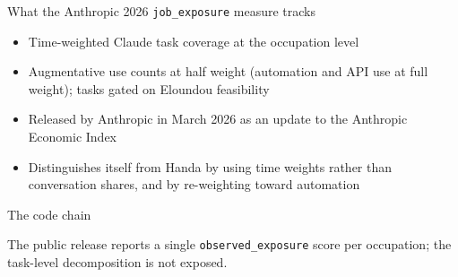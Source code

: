 
\begin{frame}{What the Anthropic 2026 \texttt{job\_exposure} measure tracks}
\begin{itemize}\setlength{\itemsep}{6pt}
  \item Time-weighted Claude task coverage at the occupation level
  \item Augmentative use counts at half weight (automation and API use at full weight); tasks gated on Eloundou feasibility
  \item Released by Anthropic in March 2026 as an update to the Anthropic Economic Index
  \item Distinguishes itself from Handa by using time weights rather than conversation shares, and by re-weighting toward automation
\end{itemize}
\end{frame}

\begin{frame}{The code chain}
\centering
{}

\vspace{1.5em}
The public release reports a single \texttt{observed\_exposure} score per occupation; the task-level decomposition is not exposed.
\end{frame}

